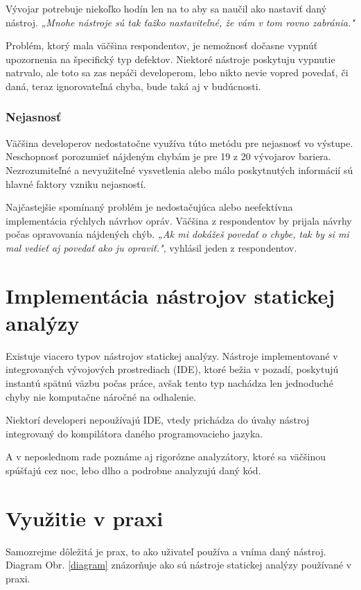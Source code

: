 \documentclass[10pt,twoside,slovak,a4paper]{article}
\begin{document}
Vývojar potrebuje niekoľko hodín len na to aby sa naučil ako nastaviť daný nástroj. \emph{„Mnohe nástroje sú tak ťažko nastaviteľné, že vám v tom rovno zabránia."}

Problém, ktorý mala väčšina respondentov, je nemožnosť dočasne vypnúť upozornenia na špecifický typ defektov. Niektoré
nástroje poskytuju vypnutie natrvalo, ale toto sa zas nepáči developerom, lebo nikto nevie vopred povedať, či daná,
teraz ignorovateľná chyba, bude taká aj v budúcnosti.

\subsubsection*{Nejasnosť}
Väčšina developerov nedostatočne využíva túto metódu pre nejasnosť vo výstupe. Neschopnosť porozumieť nájdeným chybám
je pre 19 z 20 vývojarov bariera. Nezrozumiteľné a nevyužiteľné vysvetlenia alebo málo poskytnutých informácií sú hlavné
faktory vzniku nejasností.

Najčastejšie spomínaný problém je nedostačujúca alebo neefektívna implementácia rýchlych návrhov opráv. Väčšina z
respondentov by prijala návrhy počas opravovania nájdených chýb. \emph{„Ak mi dokážeš povedať o chybe, tak by si mi mal
	vedieť aj povedať ako ju opraviť."}, vyhlásil jeden z respondentov.

\section{Implementácia nástrojov statickej analýzy} \label{implementacia}
Existuje viacero typov nástrojov statickej analýzy. Nástroje implementované v integrovaných vývojových prostrediach (IDE),
ktoré bežia v pozadí, poskytujú instantú spätnú väzbu počas práce, avšak tento typ nachádza len jednoduché chyby nie
komputačne náročné na odhalenie.

Niektorí developeri nepoužívajú IDE, vtedy prichádza do úvahy nástroj integrovaný do
kompilátora daného programovacieho jazyka.

A v neposlednom rade poznáme aj rigorózne analyzátory, ktoré sa väčšinou
spúšťajú cez noc, lebo dlho a podrobne analyzujú daný kód.\cite{BrittanyJohnson, LisaNguyen}

\section{Využitie v praxi} \label{dev}
Samozrejme dôležitá je prax, to ako uživateľ používa a vníma daný nástroj\cite{LisaNguyen}.
Diagram Obr. \ref*{diagram} znázorňuje ako sú nástroje statickej analýzy používané v praxi.
\end{document}
